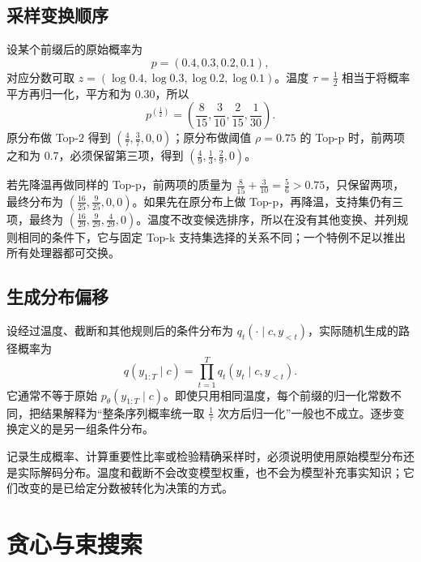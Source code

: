 \documentclass[../textbook.tex]{subfiles}
\begin{document}
\subsection{采样变换顺序}
\begin{example}
设某个前缀后的原始概率为
\begin{equation}
 p=(0.4,0.3,0.2,0.1),
\end{equation}
对应分数可取 $z=(\log0.4,\log0.3,\log0.2,\log0.1)$。温度 $\tau=\frac{1}{2}$ 相当于将概率平方再归一化，平方和为 $0.30$，所以
\begin{equation}
 p^{(\frac{1}{2})}=\left(\frac8{15},\frac3{10},\frac2{15},\frac1{30}\right).
\end{equation}
原分布做 Top-$2$ 得到 $(\frac{4}{7},\frac{3}{7},0,0)$；原分布做阈值 $\rho=0.75$ 的 Top-p 时，前两项之和为 $0.7$，必须保留第三项，得到 $(\frac{4}{9},\frac{1}{3},\frac{2}{9},0)$。

若先降温再做同样的 Top-p，前两项的质量为 $\frac{8}{15}+\frac{3}{10}=\frac{5}{6}>0.75$，只保留两项，最终分布为 $(\frac{16}{25},\frac{9}{25},0,0)$。如果先在原分布上做 Top-p，再降温，支持集仍有三项，最终为 $(\frac{16}{29},\frac{9}{29},\frac{4}{29},0)$。温度不改变候选排序，所以在没有其他变换、并列规则相同的条件下，它与固定 Top-k 支持集选择的关系不同；一个特例不足以推出所有处理器都可交换。
\end{example}

\subsection{生成分布偏移}
设经过温度、截断和其他规则后的条件分布为 $q_t(\cdot\mid c,y_{<t})$，实际随机生成的路径概率为
\begin{equation}
 q(y_{1:T}\mid c)=\prod_{t=1}^{T}q_t(y_t\mid c,y_{<t}).
\end{equation}
它通常不等于原始 $p_\theta(y_{1:T}\mid c)$。即使只用相同温度，每个前缀的归一化常数不同，把结果解释为“整条序列概率统一取 $\frac{1}{\tau}$ 次方后归一化”一般也不成立。逐步变换定义的是另一组条件分布。

记录生成概率、计算重要性比率或检验精确采样时，必须说明使用原始模型分布还是实际解码分布。温度和截断不会改变模型权重，也不会为模型补充事实知识；它们改变的是已给定分数被转化为决策的方式。

\section{贪心与束搜索}
\end{document}
